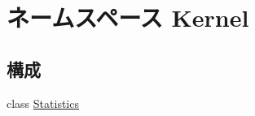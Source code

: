 \hypertarget{namespaceKernel}{
\section{ネームスペース Kernel}
\label{namespaceKernel}
}
\subsection*{構成}
\begin{DoxyCompactItemize}
\item 
class \hyperlink{classKernel_1_1Statistics}{Statistics}
\end{DoxyCompactItemize}
